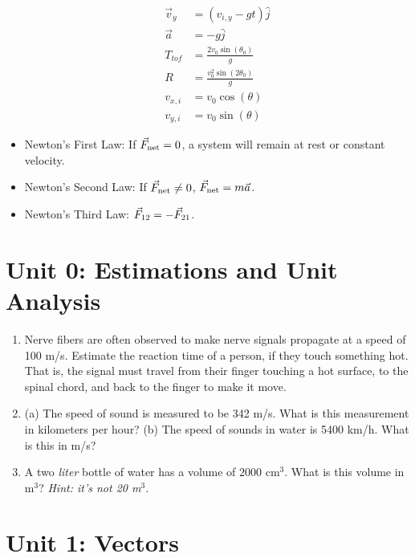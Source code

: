 \documentclass[10pt]{article}
\begin{document}
\begin{itemize}
\begin{align}
\vec{v}_y &= (v_{i,y} - g t) \hat{j} \\
\vec{a} &= -g \hat{j} \\
T_{tof} &= \frac{2 v_0\sin(\theta_0)}{g} \\
R &= \frac{v_0^2\sin(2\theta_0)}{g} \\
v_{x,i} &= v_0 \cos(\theta) \\
v_{y,i} &= v_0 \sin(\theta)
\end{align}
\item Newton's First Law: If $\vec{F}_{\rm net} = 0$, a system will remain at rest or constant velocity.
\item Newton's Second Law: If $\vec{F}_{\rm net} \neq 0$, $\vec{F}_{\rm net} = m\vec{a}$.
\item Newton's Third Law: $\vec{F}_{\rm 12} = - \vec{F}_{\rm 21}$.
\end{itemize}

\section{Unit 0: Estimations and Unit Analysis}

\begin{enumerate}
\item Nerve fibers are often observed to make nerve signals propagate at a speed of 100 m/s.  Estimate the reaction time of a person, if they touch something hot.  That is, the signal must travel from their finger touching a hot surface, to the spinal chord, and back to the finger to make it move. \\ \vspace{1.0cm}
\item (a) The speed of sound is measured to be 342 m/s. What is this measurement in kilometers per hour?  (b) The speed of sounds in water is 5400 km/h.  What is this in m/s? \\ \vspace{0.5cm}
\item A two \textit{liter} bottle of water has a volume of $2000$ cm$^3$.  What is this volume in m$^3$?  \textit{Hint: it's not 20 m$^3$.}\\ \vspace{0.5cm}
\end{enumerate}

\section{Unit 1: Vectors}
\end{document}
